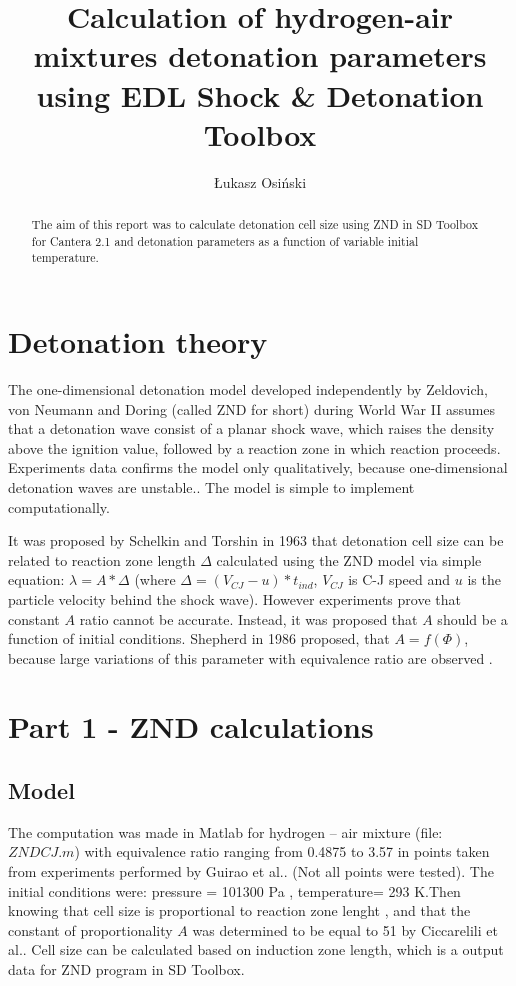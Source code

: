 \documentclass[a4paper]{article}
\title{Calculation of hydrogen-air mixtures detonation parameters using EDL Shock \& Detonation Toolbox}
\author{Łukasz Osiński}
\begin{document}
\maketitle

\begin{abstract}
The aim of this report was to calculate detonation cell size using ZND in SD Toolbox for Cantera 2.1 and detonation parameters as a function of variable initial temperature.
\end{abstract}

\section{Detonation theory}
The one-dimensional detonation model developed independently by Zeldovich, von Neumann and Doring (called ZND for short) during World War II assumes that a detonation wave consist of a planar shock wave, which raises the density above the ignition value,  followed by a reaction zone in which reaction proceeds. Experiments data confirms the model only qualitatively, because one-dimensional detonation waves are unstable.\cite{G_Summary}. The model is simple to implement computationally.

It was proposed by Schelkin and Torshin in 1963 that detonation cell size can be related to reaction zone length $\Delta$ calculated using the ZND model \cite{Ciccarelli} via simple equation: $\lambda=A*\Delta$ (where $\Delta=(V_{CJ}-u)*t_{ind}$,  $V_{CJ}$ is C-J speed and $u$ is the particle velocity behind the shock wave).
However experiments prove that constant $A$ ratio cannot be accurate. Instead, it was proposed that $A$ should be a function of initial conditions. Shepherd in 1986 proposed, that $A = f(\Phi)$, because large variations of this parameter with equivalence ratio are observed \cite{Remy}.

\section{Part 1 - ZND calculations}
\subsection{Model}

The computation was made in Matlab for hydrogen  – air mixture (file: $ZNDCJ.m$) with equivalence ratio ranging from 0.4875 to 3.57 in points taken from experiments performed by Guirao et al.\cite{Guirao}. (Not all points were tested). The initial conditions were: pressure = 101300 Pa , temperature= 293 K.Then knowing that cell size is proportional to reaction zone lenght , and that the constant of proportionality $A$ was determined to be equal to 51 by Ciccarelili et al.\cite{Ciccarelli}. Cell size can be calculated based on induction zone length, which is a output data for ZND program in SD Toolbox. 
\end{document}
